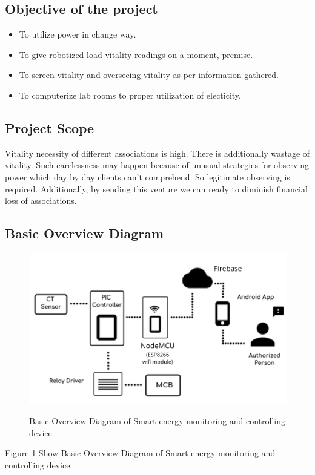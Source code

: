 \documentclass[12pt,a4paper]{article}
\begin{document}
\subsection{Objective of the project}
\begin{itemize}
	\item To utilize power in change way. 
	\item To give robotized load vitality readings on a moment, premise. 
	\item To screen vitality and overseeing vitality as per information gathered. 
	\item To computerize lab rooms to proper utilization of electicity.
\end{itemize}
\subsection{Project Scope}
\hspace{0.5cm}Vitality necessity of different associations is high. There is additionally wastage of vitality. Such carelessness may happen because of unusual strategies for observing power which day by day clients can't comprehend. So legitimate observing is required. Additionally, by sending this venture we can ready to diminish financial loss of associations.

\subsection{Basic Overview Diagram }

\begin{figure}[H]
	\centering
	\includegraphics[width=\linewidth]{FirebaseAr.png}\\
	\caption{Basic Overview Diagram of Smart energy monitoring and controlling device}
	\label{fig:1.5}
\end{figure}
\begin{center}
Figure \ref{fig:1.5} Show Basic Overview Diagram of Smart energy monitoring and controlling device.
\end{center}
\end{document}
